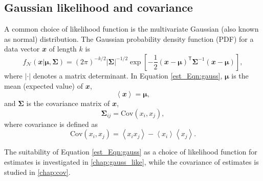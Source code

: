 \subsection{Gaussian likelihood and covariance}
\label{est_sec:Gaussian}

A common choice of likelihood function is the multivariate Gaussian (also known as normal) distribution. The Gaussian probability density function (PDF) for a data vector $\mathbfit{x}$ of length $k$ is
\begin{equation}
f_\mathcal{N} \left( \mathbfit{x} | \bm{\mu}, \bm{\Sigma} \right)
= \left( 2 \pi \right)^{- k / 2}
\left| \bm{\Sigma} \right|^{-1/2}
\exp \left[ - \frac{1}{2} \left( \mathbfit{x} - \bm{\mu} \right)^\mathsf{T}
\bm{\Sigma}^{-1} \left( \mathbfit{x} - \bm{\mu} \right) \right],
\label{est_Eqn:gauss}
\end{equation}
where $\left| \cdot \right|$ denotes a matrix determinant. In Equation \eqref{est_Eqn:gauss}, $\bm{\mu}$ is the mean (expected value) of $\mathbfit{x}$,
\begin{equation}
\left\langle \mathbfit{x} \right\rangle = \bm{\mu},
\end{equation}
and $\bm{\Sigma}$ is the covariance matrix of $\mathbfit{x}$,
\begin{equation}
\bm{\Sigma}_{ij} = \text{Cov}\left( x_i, x_j \right),
\end{equation}
where covariance is defined as
\begin{equation}
\text{Cov}\left( x_i, x_j \right)
= \left\langle x_i x_j \right\rangle -
\left\langle x_i \right\rangle \left\langle x_j \right\rangle.
\label{est_Eqn:covariance}
\end{equation}

The suitability of Equation \eqref{est_Eqn:gauss} as a choice of likelihood function for \pcl{} estimates is investigated in \autoref{chap:gauss_like}, while the covariance of \pcl{} estimates is studied in \autoref{chap:cov}.


% 
